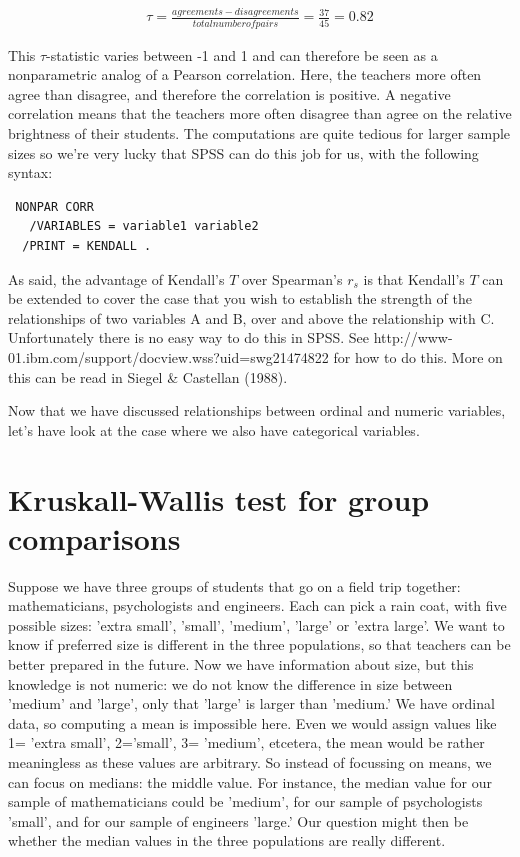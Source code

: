\documentclass[]{book}\usepackage[]{graphicx}\usepackage[]{color}
\begin{document}
 
  \begin{eqnarray}
  \tau = \frac { agreements - disagreements }{total number of pairs} = \frac{37} {45} = 0.82
  \end{eqnarray}

This $\tau$-statistic varies between -1 and 1 and can therefore be seen as a nonparametric analog of a Pearson correlation. Here, the teachers more often agree than disagree, and therefore the correlation is positive. A negative correlation means that the teachers more often disagree than agree on the relative brightness of their students. 
The computations are quite tedious for larger sample sizes so we're very lucky that SPSS can do this job for us, with the following syntax:


 \begin{verbatim}
 NONPAR CORR 
   /VARIABLES = variable1 variable2 
  /PRINT = KENDALL .
 \end{verbatim}


As said, the advantage of Kendall's $T$ over Spearman's $r_s$ is that Kendall's $T$ can be extended to cover the case that you wish to establish the strength of the relationships of two variables A and B, over and above the relationship with C. Unfortunately there is no easy way to do this in SPSS. See http://www-01.ibm.com/support/docview.wss?uid=swg21474822 for how to do this. More on this can be read in Siegel \& Castellan (1988).

        
Now that we have discussed relationships between ordinal and numeric variables, let's have look at the case where we also have categorical variables.


\section{Kruskall-Wallis test for group comparisons}


Suppose we have three groups of students that go on a field trip together: mathematicians, psychologists and engineers. Each can pick a rain coat, with five possible sizes: 'extra small', 'small', 'medium', 'large' or 'extra large'. We want to know if preferred size is different in the three populations, so that teachers can be better prepared in the future. Now we have information about size, but this knowledge is not numeric: we do not know the difference in size between 'medium' and 'large', only that 'large' is larger than 'medium.' We have ordinal data, so computing a mean is impossible here. Even we would assign values like 1= 'extra small', 2='small', 3= 'medium', etcetera, the mean would be rather meaningless as these values are arbitrary. So instead of focussing on means, we can focus on medians: the middle value. For instance, the median value for our sample of mathematicians could be 'medium', for our sample of psychologists 'small', and for our sample of engineers 'large.' Our question might then be whether the median values in the three populations are really different. 
\end{document}
